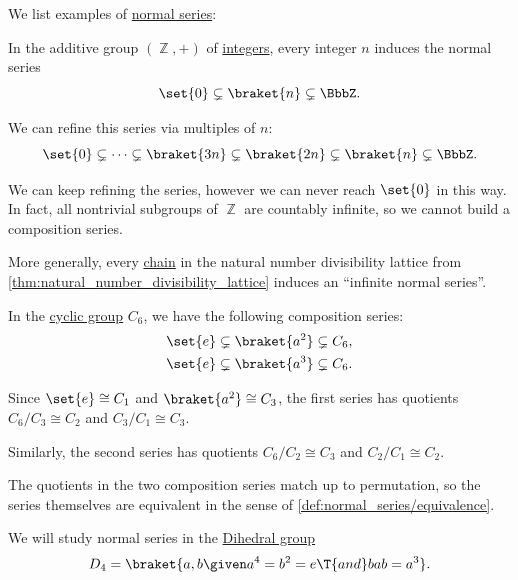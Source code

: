 \begin{example}\label{ex:def:normal_series}
  We list examples of \hyperref[def:normal_series]{normal series}:
  \begin{thmenum}
     In the additive group \( (\BbbZ, +) \) of \hyperref[def:integers]{integers}, every integer \( n \) induces the normal series
    \begin{equation*}
      \set{ 0 } \subsetneq \braket{ n } \subsetneq \BbbZ.
    \end{equation*}

    We can refine this series via multiples of \( n \):
    \begin{equation*}
      \set{ 0 } \subsetneq \cdots \subsetneq \braket{ 3n } \subsetneq  \braket{ 2n } \subsetneq \braket{ n } \subsetneq \BbbZ.
    \end{equation*}

    We can keep refining the series, however we can never reach \( \set{ 0 } \) in this way. In fact, all nontrivial subgroups of \( \BbbZ \) are countably infinite, so we cannot build a composition series.

    More generally, every \hyperref[def:partial_order_connectedness]{chain} in the natural number divisibility lattice from \cref{thm:natural_number_divisibility_lattice} induces an \enquote{infinite normal series}.

     In the \hyperref[def:cyclic_group]{cyclic group} \( C_6 \), we have the following composition series:
    \begin{align*}
      \set{ e } \subsetneq \braket{ a^2 } \subsetneq C_6, \\
      \set{ e } \subsetneq \braket{ a^3 } \subsetneq C_6.
    \end{align*}

    Since \( \set{ e } \cong C_1 \) and \( \braket{ a^2 } \cong C_3 \), the first series has quotients \( C_6 / C_3 \cong C_2 \) and \( C_3 / C_1 \cong C_3 \).

    Similarly, the second series has quotients \( C_6 / C_2 \cong C_3 \) and \( C_2 / C_1 \cong C_2 \).

    The quotients in the two composition series match up to permutation, so the series themselves are equivalent in the sense of \cref{def:normal_series/equivalence}.

     We will study normal series in the \hyperref[def:dihedral_group]{Dihedral group}
    \begin{equation*}
      D_4 = \braket{ a, b \given a^4 = b^2 = e \T{and} bab = a^3 }.
    \end{equation*}


\end{thmenum}
\end{example}
